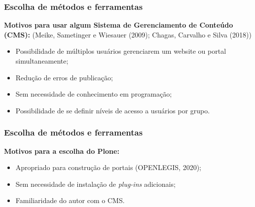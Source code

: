 \documentclass[xcolor=table]{beamer}
\begin{document}
\begin{frame}
    \frametitle{Escolha de métodos e ferramentas}
    \textbf{Motivos para usar algum Sistema de Gerenciamento de Conteúdo (CMS):} (Meike, Sametinger e Wiesauer (2009); Chagas, Carvalho e Silva (2018))
    \begin{itemize}
        \item Possibilidade de múltiplos usuários gerenciarem um website ou portal simultaneamente;
        \item Redução de erros de publicação; %
        \item Sem necessidade de conhecimento em programação; %
        \item Possibilidade de se definir níveis de acesso a usuários por grupo. %
    \end{itemize}
\end{frame}

\begin{frame}
    \frametitle{Escolha de métodos e ferramentas}
    \textbf{Motivos para a escolha do Plone:}
    \begin{itemize}
        \item Apropriado para construção de portais (OPENLEGIS, 2020); %
        \item Sem necessidade de instalação de \textit{plug-ins} adicionais; %
        \item Familiaridade do autor com o CMS.
    \end{itemize}
\end{frame}
\end{document}
